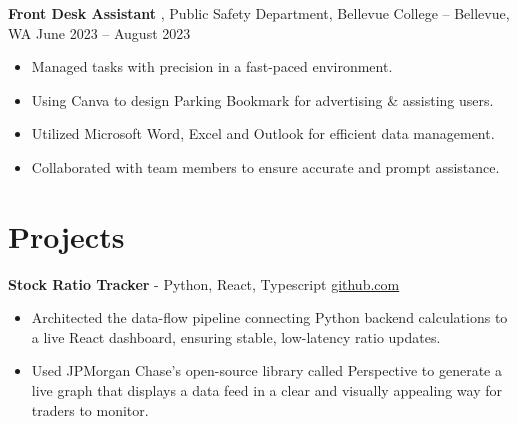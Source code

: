 \documentclass[11pt]{article}       %
\begin{document}
\textbf{Front Desk Assistant} {, Public Safety Department, Bellevue College} -- Bellevue, WA \hfill June 2023 -- August 2023 \\
\vspace{-9pt}
\begin{itemize}
  \item Managed tasks with precision in a fast-paced environment.
  \item Using Canva to design Parking Bookmark for advertising \& assisting users.
  \item Utilized Microsoft Word, Excel and Outlook for efficient data management.
  \item Collaborated with team members to ensure accurate and prompt assistance.
\end{itemize}

\vspace{-18.5pt}

\section*{Projects}

\textbf{Stock Ratio Tracker}{ - Python, React, Typescript} \hfill \href{https://github.com/Monica20030707/tradingDashboard-UI}{github.com} \\
\vspace{-9pt}
\begin{itemize}
  \item Architected the data-flow pipeline connecting Python backend calculations to a live React dashboard, ensuring stable, low-latency ratio updates. 
  \item Used JPMorgan Chase’s open-source library called Perspective to generate a live graph that displays a data feed in a clear and visually appealing way for traders to monitor.
  
\end{itemize}

\end{document}
